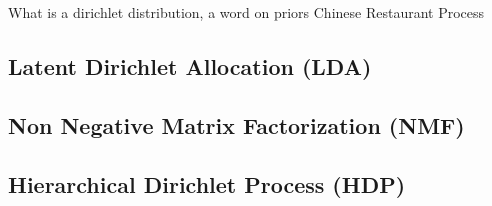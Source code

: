       What is a dirichlet distribution, a word on priors
      Chinese Restaurant Process \cite{Nothing}

  \subsection{Latent Dirichlet Allocation (LDA)}
    \cite{PLSA2001, LDA2003}

  \subsection{Non Negative Matrix Factorization (NMF)}
    \cite{NMF1999}

  \subsection{Hierarchical Dirichlet Process (HDP)}
    \cite{PLSA2001, LDA2003}

